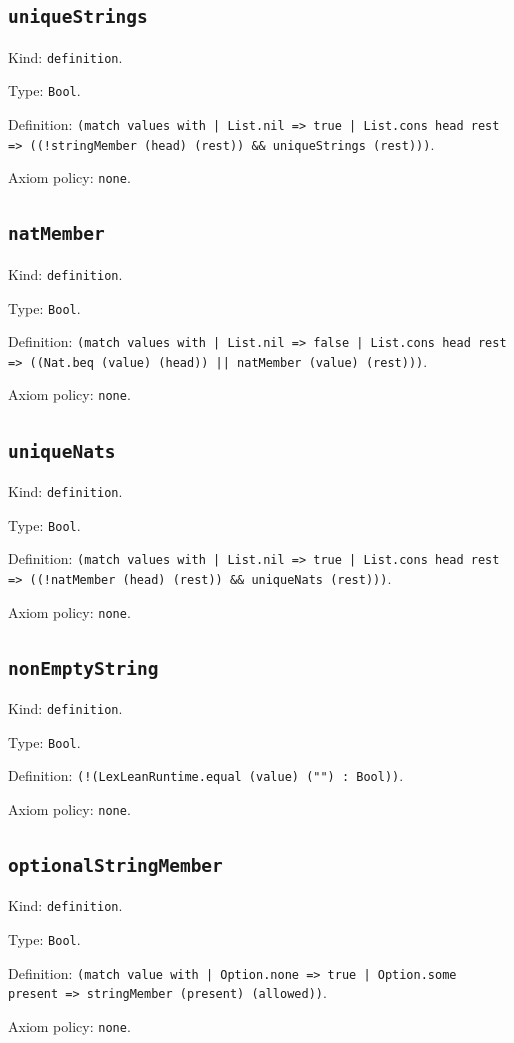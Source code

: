 \documentclass[11pt]{article}
\begin{document}
\subsection*{\texttt{uniqueStrings}}
\noindent Kind: \texttt{definition}.\par
\noindent Type: \texttt{Bool}.\par
\noindent Definition: \texttt{(match values with | List.nil => true | List.cons head rest => ((!stringMember (head) (rest)) \&\& uniqueStrings (rest)))}.\par
\noindent Axiom policy: \texttt{none}.\par
\subsection*{\texttt{natMember}}
\noindent Kind: \texttt{definition}.\par
\noindent Type: \texttt{Bool}.\par
\noindent Definition: \texttt{(match values with | List.nil => false | List.cons head rest => ((Nat.beq (value) (head)) || natMember (value) (rest)))}.\par
\noindent Axiom policy: \texttt{none}.\par
\subsection*{\texttt{uniqueNats}}
\noindent Kind: \texttt{definition}.\par
\noindent Type: \texttt{Bool}.\par
\noindent Definition: \texttt{(match values with | List.nil => true | List.cons head rest => ((!natMember (head) (rest)) \&\& uniqueNats (rest)))}.\par
\noindent Axiom policy: \texttt{none}.\par
\subsection*{\texttt{nonEmptyString}}
\noindent Kind: \texttt{definition}.\par
\noindent Type: \texttt{Bool}.\par
\noindent Definition: \texttt{(!(LexLeanRuntime.equal (value) ("") : Bool))}.\par
\noindent Axiom policy: \texttt{none}.\par
\subsection*{\texttt{optionalStringMember}}
\noindent Kind: \texttt{definition}.\par
\noindent Type: \texttt{Bool}.\par
\noindent Definition: \texttt{(match value with | Option.none => true | Option.some present => stringMember (present) (allowed))}.\par
\noindent Axiom policy: \texttt{none}.\par
\end{document}

